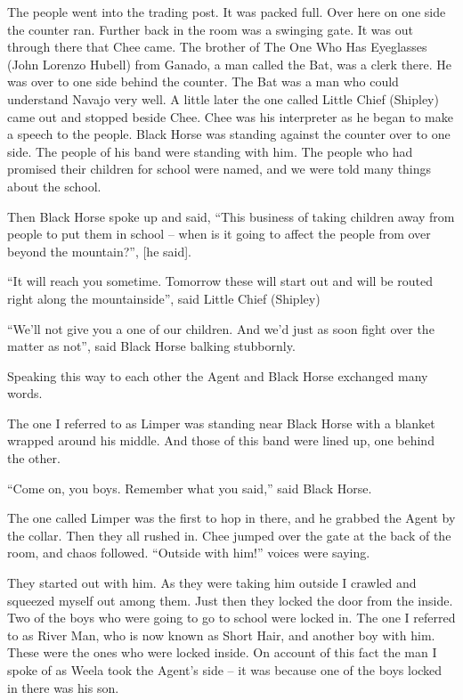 The people went into the trading post. It was packed full. Over here on one side the counter ran. Further back in the room was a swinging gate. It was out through there that Chee came. The brother of The One Who Has Eyeglasses (John Lorenzo Hubell) from Ganado, a man called the Bat, was a clerk there. He was over to one side behind the counter. The Bat was a man who could understand Navajo very well. A little later the one called Little Chief (Shipley) came out and stopped beside Chee. Chee was his interpreter as he began to make a speech to the people. Black Horse was standing against the counter over to one side. The people of his band were standing with him. The people who had promised their children for school were named, and we were told many things about the school.

Then Black Horse spoke up and said, ``This business of taking children away from people to put them in school -- when is it going to affect the people from over beyond the mountain?'', [he said].

``It will reach you sometime. Tomorrow these will start out and will be routed right along the mountainside'', said Little Chief (Shipley)

``We'll not give you a one of our children. And we'd just as soon fight over the matter as not'', said Black Horse balking stubbornly.

Speaking this way to each other the Agent and Black Horse exchanged many words.

The one I referred to as Limper was standing near Black Horse with a blanket wrapped around his middle. And those of this band were lined up, one behind the other.

``Come on, you boys. Remember what you said,'' said Black Horse.

The one called Limper was the first to hop in there, and he grabbed the Agent by the collar. Then they all rushed in. Chee jumped over the gate at the back of the room, and chaos followed.
``Outside with him!'' voices were saying.

They started out with him. As they were taking him outside I crawled and squeezed myself out among them. Just then they locked the door from the inside. Two of the boys who were going to go to school were locked in. The one I referred to as River Man, who is now known as Short Hair, and another boy with him. These were the ones who were locked inside. On account of this fact the man I spoke of as Weela took the Agent's side -- it was because one of the boys locked in there was his son.


